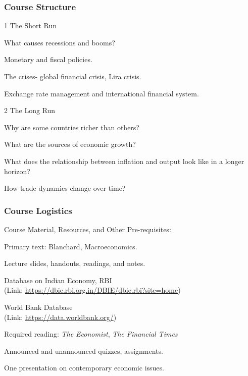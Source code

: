 \documentclass[shownotes,11pt, aspectratio=169]{beamer}
\newenvironment{wideitemize}{\itemize\addtolength{\itemsep}{10pt}}{\enditemize}
\begin{document}
\begin{frame}
\frametitle{Course Structure}
\begin{wideitemize}
\item[1] The Short Run
     \begin{wideitemize}
      \item What causes recessions and booms?
      \item Monetary and fiscal policies.
      \item The crises- global financial crisis, Lira crisis.
      \item Exchange rate management and international financial system.
      \end{wideitemize}
\item[2] The Long Run
       \begin{wideitemize}
        \item Why are some countries richer than others?
        \item What are the sources of economic growth?
         \item What does the relationship between inflation and output look like in a longer horizon?
         \item How trade dynamics change over time?
         \end{wideitemize}
\end{wideitemize}
\end{frame}

\begin{frame}
\frametitle{Course Logistics}
 Course Material, Resources, and Other Pre-requisites:
    \begin{wideitemize}
     \item Primary text: Blanchard, Macroeconomics.
     \item Lecture slides, handouts, readings, and notes.
     \item Database on Indian Economy, RBI \\
           (Link: \url{https://dbie.rbi.org.in/DBIE/dbie.rbi?site=home})
     \item World Bank Database \\
           (Link: \url{https://data.worldbank.org/})
      \pause
     \item Required reading: \textit{The Economist}, \textit{The Financial Times}
      \pause
     \item Announced and unannounced quizzes, assignments.
     \item One presentation on contemporary economic issues.
     \end{wideitemize}
\end{frame}
\end{document}

